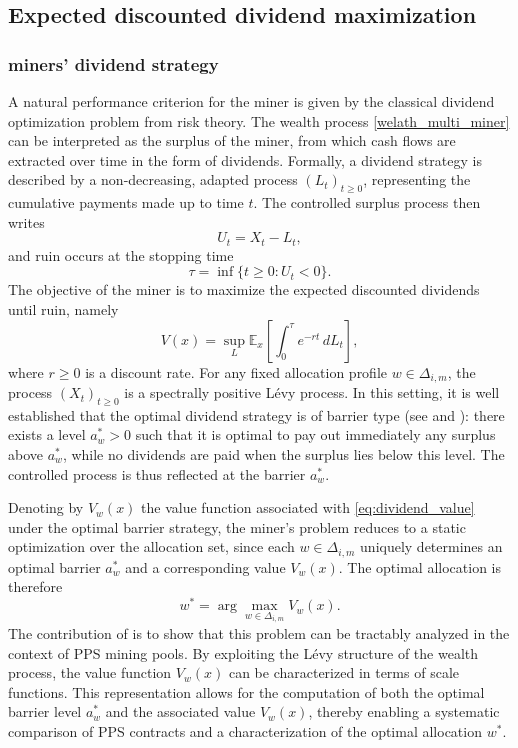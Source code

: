\subsection{Expected discounted dividend maximization}
\subsubsection{miners' dividend strategy}

A natural performance criterion for the miner is given by the classical dividend optimization problem from risk theory. The wealth process \eqref{welath_multi_miner} can be interpreted as the surplus of the miner, from which cash flows are extracted over time in the form of dividends. Formally, a dividend strategy is described by a non-decreasing, adapted process $(L_t)_{t \geq 0}$, representing the cumulative payments made up to time $t$. The controlled surplus process then writes
\[
    U_t = X_t - L_t,
\]
and ruin occurs at the stopping time
\[
    \tau = \inf\{t \geq 0 : U_t < 0\}.
\]
The objective of the miner is to maximize the expected discounted dividends
until ruin, namely
\begin{equation}\label{eq:dividend_value}
    V(x) = \sup_{L} \mathbb{E}_x\left[\int_0^{\tau} e^{-rt} \, dL_t \right],
\end{equation}
where $r \geq 0$ is a discount rate. For any fixed allocation profile $w \in \Delta_{i,m}$, the process $(X_t)_{t \geq 0}$ is a spectrally positive L\'{e}vy process. In this setting, it is well established that the optimal dividend strategy is of barrier type (see \citet{avanzi2007optimal} and \citet{bayraktar2013optimal}): there exists a level $a_w^* > 0$ such that it is optimal to pay out immediately any surplus above $a_w^*$, while no dividends are paid when the surplus lies below this level. The controlled process is thus reflected at the barrier $a_w^*$.

Denoting by $V_w(x)$ the value function associated with \eqref{eq:dividend_value} under the optimal barrier strategy, the miner's problem reduces to a static optimization over the allocation set, since each $w \in \Delta_{i,m}$ uniquely determines an optimal barrier $a_w^*$ and a corresponding value $V_w(x)$. The optimal allocation is therefore
\[
    w^* = \arg\max_{w \in \Delta_{i,m}} V_w(x).
\]
The contribution of \citet{goffard2025hashpower} is to show that this problem can be tractably analyzed in the context of PPS mining pools. By exploiting the L\'{e}vy structure of the wealth process, the value function $V_w(x)$ can be characterized in terms of scale functions. This representation allows for the computation of both the optimal barrier level $a_w^*$ and the associated value $V_w(x)$, thereby enabling a systematic comparison of PPS contracts and a characterization of the optimal allocation $w^*$.

